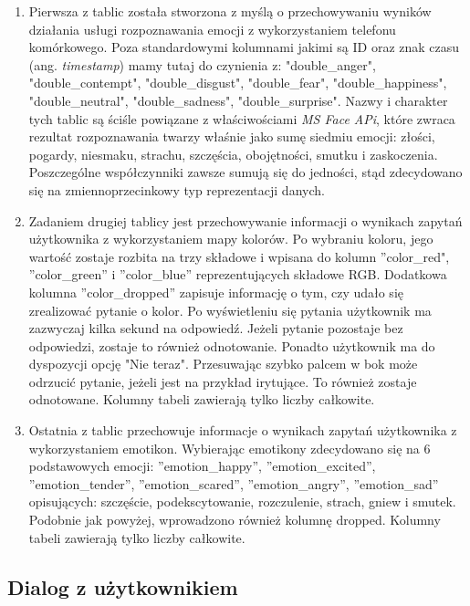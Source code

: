 \begin{enumerate}
	\item Pierwsza z tablic została stworzona z myślą o przechowywaniu wyników działania usługi rozpoznawania emocji z wykorzystaniem telefonu komórkowego. Poza standardowymi kolumnami jakimi są ID oraz znak czasu (ang. \textit{timestamp}) mamy tutaj do czynienia z: "double\_anger", "double\_contempt", "double\_disgust", "double\_fear", "double\_happiness", "double\_neutral", "double\_sadness", "double\_surprise". Nazwy i charakter tych tablic są ściśle powiązane z właściwościami \textit{MS Face APi}, które zwraca rezultat rozpoznawania twarzy właśnie jako sumę siedmiu emocji: złości, pogardy, niesmaku, strachu, szczęścia, obojętności, smutku i zaskoczenia. Poszczególne współczynniki zawsze sumują się do jedności, stąd zdecydowano się na zmiennoprzecinkowy typ reprezentacji danych.
	
	\item Zadaniem drugiej tablicy jest przechowywanie informacji o wynikach zapytań użytkownika z wykorzystaniem mapy kolorów. Po wybraniu koloru, jego wartość zostaje rozbita na trzy składowe i wpisana do kolumn ''color\_red", ''color\_green'' i ''color\_blue'' reprezentujących składowe RGB. Dodatkowa kolumna ''color\_dropped'' zapisuje informację o tym, czy udało się zrealizować pytanie o kolor. Po wyświetleniu się pytania użytkownik ma zazwyczaj kilka sekund na odpowiedź. Jeżeli pytanie pozostaje bez odpowiedzi, zostaje to również odnotowanie. Ponadto użytkownik ma do dyspozycji opcję "Nie teraz". Przesuwając szybko palcem w bok może odrzucić pytanie, jeżeli jest na przykład irytujące. To również zostaje odnotowane. Kolumny tabeli zawierają tylko liczby całkowite.
	
	\item Ostatnia z tablic przechowuje informacje o wynikach zapytań użytkownika z wykorzystaniem emotikon. Wybierając emotikony zdecydowano się na 6 podstawowych emocji: ''emotion\_happy'', ''emotion\_excited'', ''emotion\_tender'', ''emotion\_scared'', ''emotion\_angry'', ''emotion\_sad'' opisujących: szczęście, podekscytowanie, rozczulenie, strach, gniew i smutek. Podobnie jak powyżej, wprowadzono również kolumnę dropped. Kolumny tabeli zawierają tylko liczby całkowite.
\end{enumerate}


\subsection{Dialog z użytkownikiem}

